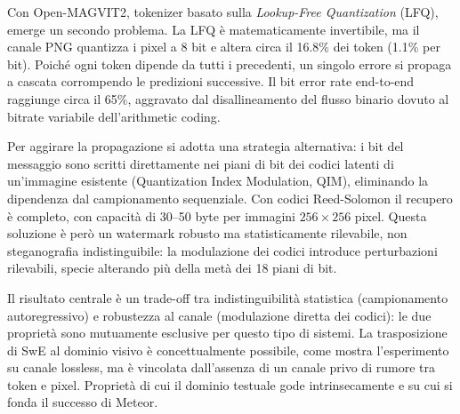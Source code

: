 \documentclass[a4paper, 11pt]{article}
\begin{document}
Con Open-MAGVIT2, tokenizer basato sulla \emph{Lookup-Free Quantization} (LFQ), emerge un secondo problema. La LFQ è matematicamente invertibile, ma il canale PNG quantizza i pixel a 8 bit e altera circa il 16.8\% dei token (1.1\% per bit). Poiché ogni token dipende da tutti i precedenti, un singolo errore si propaga a cascata corrompendo le predizioni successive. Il bit error rate end-to-end raggiunge circa il 65\%, aggravato dal disallineamento del flusso binario dovuto al bitrate variabile dell'arithmetic coding.

Per aggirare la propagazione si adotta una strategia alternativa: i bit del messaggio sono scritti direttamente nei piani di bit dei codici latenti di un'immagine esistente (Quantization Index Modulation, QIM), eliminando la dipendenza dal campionamento sequenziale. Con codici Reed-Solomon il recupero è completo, con capacità di 30--50 byte per immagini $256\times 256$ pixel. Questa soluzione è però un watermark robusto ma statisticamente rilevabile, non steganografia indistinguibile: la modulazione dei codici introduce perturbazioni rilevabili, specie alterando più della metà dei 18 piani di bit.

Il risultato centrale è un trade-off tra indistinguibilità statistica (campionamento autoregressivo) e robustezza al canale (modulazione diretta dei codici): le due proprietà sono mutuamente esclusive per questo tipo di sistemi. La trasposizione di SwE al dominio visivo è concettualmente possibile, come mostra l'esperimento su canale lossless, ma è vincolata dall'assenza di un canale privo di rumore tra token e pixel. Proprietà di cui il dominio testuale gode intrinsecamente e su cui si fonda il successo di Meteor.
\end{document}
